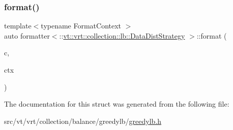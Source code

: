 \subsubsection{\texorpdfstring{format()}{format()}}
{\footnotesize\ttfamily template$<$typename Format\+Context $>$ \\
auto formatter$<$\+::\hyperlink{namespacevt_1_1vrt_1_1collection_1_1lb_a0c49bf89a59ba0fd5160bc3894417dfa}{vt\+::vrt\+::collection\+::lb\+::\+Data\+Dist\+Strategy} $>$\+::format (\begin{DoxyParamCaption}\item[{\+::\hyperlink{namespacevt_1_1vrt_1_1collection_1_1lb_a0c49bf89a59ba0fd5160bc3894417dfa}{vt\+::vrt\+::collection\+::lb\+::\+Data\+Dist\+Strategy}}]{c,  }\item[{Format\+Context \&}]{ctx }\end{DoxyParamCaption})\hspace{0.3cm}{\ttfamily [inline]}}



The documentation for this struct was generated from the following file\+:\begin{DoxyCompactItemize}
\item 
src/vt/vrt/collection/balance/greedylb/\hyperlink{greedylb_8h}{greedylb.\+h}\end{DoxyCompactItemize}
